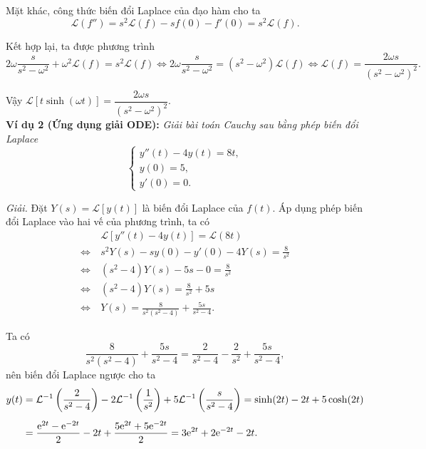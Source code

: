 \documentclass[10pt, a4paper]{article}
\begin{document}
	Mặt khác, công thức biến đổi Laplace của đạo hàm cho ta $$\mathcal L(f'')=s^2\mathcal L(f)-sf(0)-f'(0)=s^2\mathcal L(f).$$
	
	Kết hợp lại, ta được phương trình $$2\omega\frac{s}{s^2-\omega^2}+\omega^2\mathcal L(f)=s^2\mathcal L(f)\iff2\omega\frac{s}{s^2-\omega^2}=(s^2-\omega^2)\mathcal L(f)\iff\mathcal L(f)=\frac{2\omega s}{(s^2-\omega^2)^2}.$$
	
	Vậy $\mathcal L[t\sinh(\omega t)]=\dfrac{2\omega s}{(s^2-\omega^2)^2}$.\\
	
	\textbf{Ví dụ 2 (Ứng dụng giải ODE):} \textit{Giải bài toán Cauchy sau bằng phép biến đổi Laplace} $$\begin{cases}
		y''(t)-4y(t)=8t,\\
		y(0)=5,\\
		y'(0)=0.
	\end{cases}$$
	
	\textit{Giải.} Đặt $Y(s)=\mathcal L[y(t)]$ là biến đổi Laplace của $f(t)$. Áp dụng phép biến đổi Laplace vào hai vế của phương trình, ta có \begin{align*}
		&\mathcal L[y''(t)-4y(t)]=\mathcal L(8t)\\
		\Leftrightarrow~&s^2Y(s)-sy(0)-y'(0)-4Y(s)=\frac{8}{s^2}\\
		\Leftrightarrow~&(s^2-4)Y(s)-5s-0=\frac{8}{s^2}\\
		\Leftrightarrow~&(s^2-4)Y(s)=\frac{8}{s^2}+5s\\
		\Leftrightarrow~&Y(s)=\frac{8}{s^2(s^2-4)}+\frac{5s}{s^2-4}.
	\end{align*}
	
	Ta có $$\frac{8}{s^2(s^2-4)}+\frac{5s}{s^2-4}=\frac{2}{s^2-4}-\frac{2}{s^2}+\frac{5s}{s^2-4},$$
	nên biến đổi Laplace ngược cho ta \begin{align*}
		y(t)&=\mathcal L^{-1}\left(\frac{2}{s^2-4}\right)-2\mathcal L^{-1}\left(\frac{1}{s^2}\right)+5\mathcal L^{-1}\left(\frac{s}{s^2-4}\right)=\sinh(2t)-2t+5\cosh(2t)\\
		\noalign{\vskip5pt}
		&=\frac{\mathrm e^{2t}-\mathrm e^{-2t}}{2}-2t+\frac{5\mathrm e^{2t}+5\mathrm e^{-2t}}{2}=3\mathrm e^{2t}+2\mathrm e^{-2t}-2t.
	\end{align*}
\end{document}
